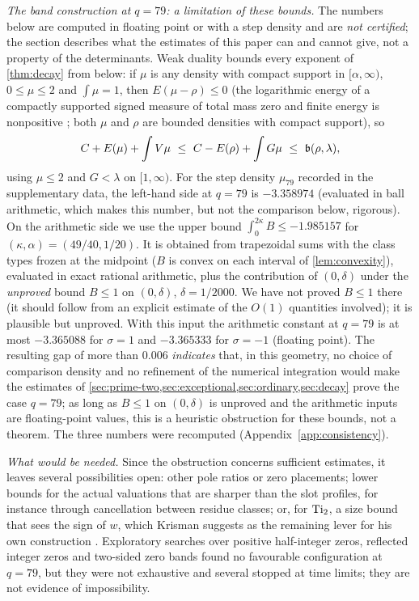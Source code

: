 \emph{The band construction at $q=79$: a limitation of these bounds.} The numbers below are
computed in floating point or with a step density and are \emph{not certified}; the section
describes what the estimates of this paper can and cannot give, not a property of the
determinants. Weak duality bounds every exponent of \cref{thm:decay} from below: if $\mu$ is any
density with compact support in $[\alpha,\infty)$, $0\le\mu\le2$ and $\int\mu=1$, then
$E(\mu-\rho)\le0$ (the logarithmic energy of a compactly supported signed measure of total mass
zero and finite energy is nonpositive \cite[Lemma~I.1.8]{SaffTotik1997}; both $\mu$ and $\rho$
are bounded densities with compact support), so
\[
  C+E(\mu)+\int V\mu\ \le\ C-E(\rho)+\int G\mu\ \le\ \bconst(\rho,\lambda),
\]
using $\mu\le2$ and $G<\lambda$ on $[1,\infty)$. For the step density $\mu_{79}$ recorded in the
supplementary data, the left-hand side at $q=79$ is $-3.358974$ (evaluated in ball arithmetic,
which makes this number, but not the comparison below, rigorous).
On the arithmetic side we use the upper bound
$\int_0^{2\kappa}B\le-1.985157$ for $(\kappa,\alpha)=(49/40,1/20)$. It is obtained from
trapezoidal sums with the class types frozen at the midpoint ($B$ is convex on each interval of
\cref{lem:convexity}), evaluated in exact rational arithmetic, plus the contribution of
$(0,\delta)$ under the \emph{unproved} bound $B\le1$ on $(0,\delta)$, $\delta=1/2000$. We have not
proved $B\le1$ there (it should follow from an explicit estimate of the $O(1)$ quantities
involved); it is plausible but unproved. With this input the arithmetic
constant at $q=79$ is at most $-3.365088$ for $\sigma=1$ and $-3.365333$ for $\sigma=-1$ (floating
point). The resulting gap of more than $0.006$ \emph{indicates} that, in this geometry, no choice
of comparison density and no refinement of the numerical integration would make the estimates of
\cref{sec:prime-two,sec:exceptional,sec:ordinary,sec:decay} prove the case $q=79$; as long as
$B\le1$ on $(0,\delta)$ is unproved and the arithmetic inputs are floating-point values, this is
a heuristic obstruction for these bounds, not a theorem. The three numbers were recomputed
(Appendix~\ref{app:consistency}).

\emph{What would be needed.} Since the obstruction concerns sufficient estimates, it leaves
several possibilities open: other pole ratios or zero placements; lower bounds for the actual
valuations that are sharper than the slot profiles, for instance through cancellation between
residue classes; or, for $\operatorname{Ti}_2$, a size bound that sees the sign of $w$, which Krisman suggests
as the remaining lever for his own construction \cite[\S12]{Krisman2026chi2}. Exploratory
searches over positive half-integer zeros, reflected integer zeros and two-sided zero bands
found no favourable configuration at $q=79$, but they were not exhaustive and several stopped at
time limits; they are not evidence of impossibility.

